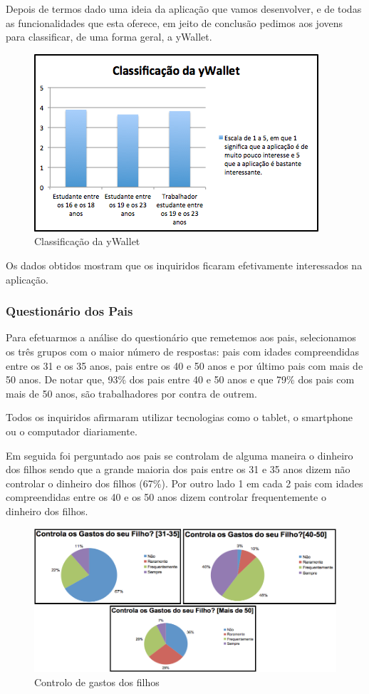 \documentclass{article}
\begin{document}
      Depois de termos dado uma ideia da aplicação que vamos desenvolver, e de todas as funcionalidades que esta oferece, em jeito de conclusão pedimos aos jovens para classificar, de uma forma geral, a yWallet.

      \begin{figure}[ht!]
        \centering
          \includegraphics[width=0.7\linewidth]{img/img7}
          \caption{Classificação da yWallet}
          \label{img7}
      \end{figure} 
     
      Os dados obtidos mostram que os inquiridos ficaram efetivamente interessados na aplicação.

    \subsubsection{Questionário dos Pais}

      Para efetuarmos a análise do questionário que remetemos aos pais, selecionamos os três grupos com o maior número de respostas: pais com idades compreendidas entre os 31 e os 35 anos, pais entre os 40 e 50 anos e por último pais com mais de 50 anos. De notar que, 93\% dos pais entre 40 e 50 anos e que 79\% dos pais com mais de 50 anos, são trabalhadores por contra de outrem.

      Todos os inquiridos afirmaram utilizar tecnologias como o tablet, o smartphone ou o computador diariamente.

      Em seguida foi perguntado aos pais se controlam de alguma maneira o dinheiro dos filhos sendo que a grande maioria dos pais entre os 31 e 35 anos dizem não controlar o dinheiro dos filhos (67\%). Por outro lado 1 em cada 2 pais com idades compreendidas entre os 40 e os 50 anos dizem controlar frequentemente o dinheiro dos filhos.

      \begin{figure}[ht!]
        \centering
          \includegraphics[width=0.7\linewidth]{img/img8}
          \caption{Controlo de gastos dos filhos}
          \label{img8}
      \end{figure}       
\end{document}
